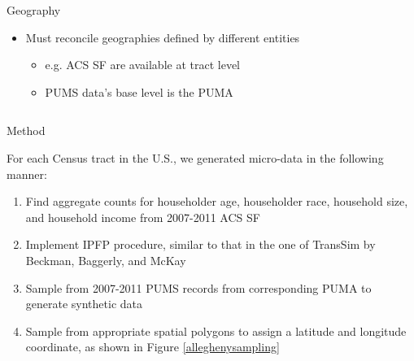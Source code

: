 \documentclass[final]{beamer}
\newlength{\onecolwid}
\newlength{\twocolwid}
\begin{document}
\begin{frame}[t]
\begin{columns}[t]
\begin{column}{\twocolwid}
\begin{columns}[t,totalwidth=\twocolwid]
\begin{column}{\onecolwid}

\begin{block}{Geography}
\begin{itemize}
\item Must reconcile geographies defined by different entities
\begin{itemize}
\item e.g. ACS SF are available at tract level
\item PUMS data's base level is the PUMA
\end{itemize}
\end{itemize}
\end{block}


\end{column} %

\end{columns} %



\begin{columns}[t,totalwidth=\twocolwid] %

\begin{column}{\onecolwid} %


\begin{block}{Method}

For each Census tract in the U.S., we generated micro-data in the following manner:
  
\begin{enumerate}
\item Find aggregate counts for householder age, householder race, household size, and household income from 2007-2011 ACS SF
\item Implement IPFP procedure, similar to that in the one of TransSim by Beckman, Baggerly, and McKay \cite{beckman.baggerly.mckay96}
\item Sample from 2007-2011  PUMS records from corresponding PUMA to generate synthetic data
\item Sample from appropriate spatial polygons to assign a latitude and longitude coordinate, as shown in Figure \ref{alleghenysampling}


\end{enumerate}
\end{block}
\end{column}
\end{columns}
\end{column}
\end{columns}
\end{frame}
\end{document}
